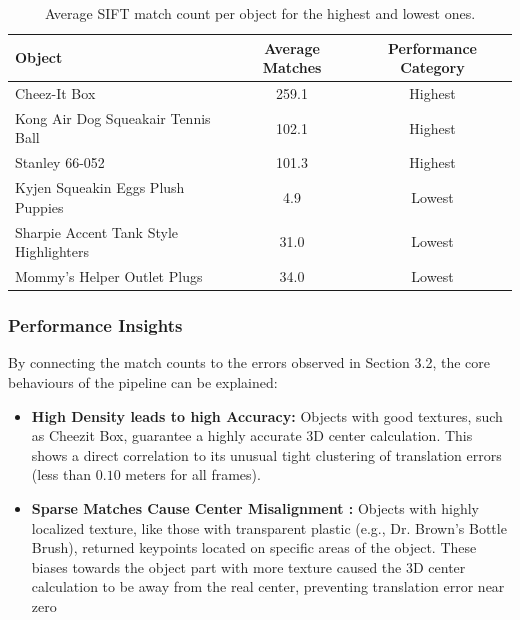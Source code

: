 \begin{table}[htbp]
    \centering
    \renewcommand{\arraystretch}{1.3}
    \caption{Average SIFT match count per object for the highest and lowest ones.}
    \vspace{0.2cm}
    \begin{tabular}{|l|c|c|}
        \hline
        \textbf{Object} & \textbf{Average Matches} & \textbf{Performance Category} \\
        \hline \hline
        Cheez-It Box & 259.1 & Highest \\
        \hline
        Kong Air Dog Squeakair Tennis Ball & 102.1 & Highest \\
        \hline
        Stanley 66-052 & 101.3 & Highest \\
        \hline \hline
        Kyjen Squeakin Eggs Plush Puppies & 4.9 & Lowest \\
        \hline
        Sharpie Accent Tank Style Highlighters & 31.0 & Lowest \\
        \hline
        Mommy's Helper Outlet Plugs & 34.0 & Lowest \\
        \hline
    \end{tabular}
    \label{tab:sift_matches}
\end{table}

\subsubsection*{Performance Insights}
By connecting the match counts to the errors observed in Section 3.2, the core behaviours of the pipeline can be explained:

\begin{itemize}
    \item \textbf{High Density leads to high Accuracy:} 
    Objects with good textures, such as Cheezit Box, guarantee a highly accurate 3D center calculation. This shows a direct correlation to its unusual tight clustering of translation errors (less than $0.10$ meters for all frames).
    
    \item \textbf{Sparse Matches Cause Center Misalignment :} Objects with highly localized texture, like those with transparent plastic (e.g., Dr. Brown's Bottle Brush), returned keypoints located on specific areas of the object. These biases towards the object part with more texture caused the 3D center calculation to be away from the real center, preventing translation error near zero
\end{itemize}

